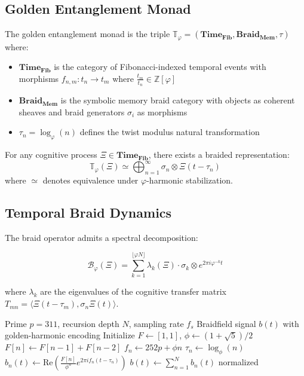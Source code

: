 \documentclass[12pt]{article}
\begin{document}
\subsection{Golden Entanglement Monad}
\begin{definition}
The golden entanglement monad is the triple $\mathbb{T}_\varphi = (\mathbf{Time_{Fib}}, \mathbf{Braid_{Mem}}, \tau)$ where:
\begin{itemize}
    \item $\mathbf{Time_{Fib}}$ is the category of Fibonacci-indexed temporal events with morphisms $f_{n,m} \colon t_n \to t_m$ where $\frac{t_m}{t_n} \in \mathbb{Z}[\varphi]$
    \item $\mathbf{Braid_{Mem}}$ is the symbolic memory braid category with objects as coherent sheaves and braid generators $\sigma_i$ as morphisms
    \item $\tau_n = \log_\varphi(n)$ defines the twist modulus natural transformation
\end{itemize}
\end{definition}

\begin{theorem}
For any cognitive process $\Xi \in \mathbf{Time_{Fib}}$, there exists a braided representation:
\[
\mathbb{T}_\varphi(\Xi) \simeq \bigoplus_{n=1}^\infty \sigma_n \otimes \Xi(t-\tau_n)
\]
where $\simeq$ denotes equivalence under $\varphi$-harmonic stabilization.
\end{theorem}

\subsection{Temporal Braid Dynamics}
The braid operator admits a spectral decomposition:

\begin{equation}
\mathcal{B}_\varphi(\Xi) = \sum_{k=1}^{\lfloor \varphi N \rfloor} \lambda_k(\Xi) \cdot \sigma_k \otimes e^{2\pi i \varphi^{-k}t}
\end{equation}

where $\lambda_k$ are the eigenvalues of the cognitive transfer matrix $T_{mn} = \langle \Xi(t-\tau_m), \sigma_n \Xi(t) \rangle$.

\begin{algorithm}[H]
\caption{Adaptive Temporal Braiding}
\begin{algorithmic}[1]
\Require Prime $p=311$, recursion depth $N$, sampling rate $f_s$
\Ensure Braidfield signal $b(t)$ with golden-harmonic encoding
\State Initialize $F \gets [1,1]$, $\phi \gets (1+\sqrt{5})/2$
    \State $F[n] \gets F[n-1] + F[n-2]$
    \State $f_n \gets 252p + \phi n$
    \State $\tau_n \gets \log_\phi(n)$
    \State $b_n(t) \gets \text{Re}\left(\frac{F[n]}{\phi^n}e^{2\pi i f_n(t-\tau_n)}\right)$
\EndFor
\State \Return $b(t) \gets \sum_{n=1}^N b_n(t)$ normalized
\end{algorithmic}
\end{algorithm}
\end{document}
